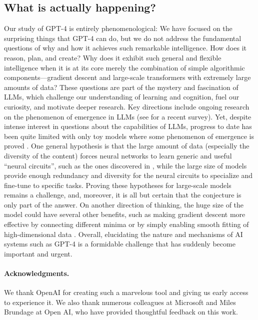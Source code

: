 \subsection{What is actually happening?} \label{sec:whatsgoingon}
Our study of {GPT-4} is entirely phenomenological: We have focused on the surprising things that {GPT-4} can do, but we do not address the fundamental questions of why and how it achieves such remarkable intelligence. How does it reason, plan, and create? Why does it exhibit such general and flexible intelligence when it is at its core merely the combination of simple algorithmic components---gradient descent and large-scale transformers with extremely large amounts of data? These questions are part of the mystery and fascination of LLMs, which challenge our understanding of learning and cognition, fuel our curiosity, and motivate deeper research. Key directions include ongoing research on the phenomenon of emergence in LLMs (see \cite{wei2022emergent} for a recent survey). Yet, despite intense interest in questions about the capabilities of LLMs, progress to date has been quite limited with only toy models where some phenomenon of emergence is proved \cite{barak2022hidden, ahn2022learning,jelassi2022vision}. One general hypothesis \cite{olah2020zoom} is that the large amount of data (especially the  diversity of the content) forces neural networks to learn generic and useful ``neural circuits'', such as the ones discovered in \cite{olsson2022context, zhang2022unveiling, liu2022transformers}, while the large size of models provide enough redundancy and diversity for the neural circuits to specialize and fine-tune to specific tasks. Proving these hypotheses for large-scale models remains a challenge, and, moreover, it is all but certain that the conjecture is only part of the answer. On another direction of thinking, the huge size of the model could have several other benefits, such as making gradient descent more effective by connecting different minima \cite{venturi2019spurious} or by simply enabling smooth fitting of high-dimensional data \cite{pmlr-v49-eldan16, NEURIPS2021_f197002b}. Overall, elucidating the nature and mechanisms of AI systems such as {GPT-4} is a formidable challenge that has suddenly become important and urgent.

\paragraph{Acknowledgments.} We thank OpenAI for creating such a marvelous tool and giving us early access to experience it. We also thank numerous colleagues at Microsoft and Miles Brundage at Open AI, who have provided thoughtful feedback on this work.


